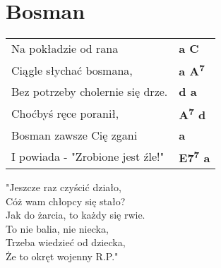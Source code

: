 \section{Bosman}

\vspace{2em}
\begin{tabular}{@{}p{7cm}@{}l@{}}
Na pokładzie od rana & \bfseries a C \\
Ciągle słychać bosmana, & \bfseries a A\textsuperscript{7}  \\
Bez potrzeby cholernie się drze. & \bfseries d a \\
Choćbyś ręce poranił, & \bfseries A\textsuperscript{7}  d \\
Bosman zawsze Cię zgani & \bfseries a \\
I powiada - "Zrobione jest źle!" & \bfseries E7\textsuperscript{7}  a \\
\end{tabular}

\vspace{1em}
"Jeszcze raz czyścić działo, \\
Cóż wam chłopcy się stało? \\
Jak do żarcia, to każdy się rwie. \\
To nie balia, nie niecka, \\
Trzeba wiedzieć od dziecka, \\
Że to okręt wojenny R.P." \\

